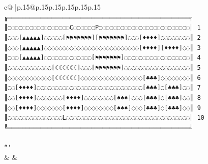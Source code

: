 \documentclass{article}
\begin{document}
{\begin{supertabular}{c@{$\;$}|p{.15\linewidth}@{}p{.15\linewidth}p{.15\linewidth}p{.15\linewidth}p{.15\linewidth}p{.15\linewidth}}
{{{\texttt{╔══════════════════════════════════════════════════╗} \\
\texttt{║◌◌◌◌◌◌◌◌◌◌◌◌◌◌◌◌◌C◌◌◌◌◌◌P◌◌◌◌◌◌◌◌◌◌◌◌◌◌◌◌◌◌◌◌◌◌◌◌◌║ 1} \\
\texttt{║◌◌◌{[}▲▲▲▲▲{]}◌◌◌◌◌{[}⚑⚑⚑⚑⚑⚑⚑{]}{[}⚑⚑⚑⚑⚑⚑⚑{]}◌◌◌{[}♦♦♦♦{]}◌◌◌◌◌◌◌◌║ 2} \\
\texttt{║◌◌◌{[}▲▲▲▲▲{]}◌◌◌◌◌◌◌◌◌◌◌◌◌◌◌◌◌◌◌◌◌◌◌◌◌◌{[}♦♦♦♦{]}{[}♦♦♦♦{]}◌◌║ 3} \\
\texttt{║◌◌◌{[}▲▲▲▲▲{]}◌◌◌◌◌◌◌◌◌◌◌◌◌{[}⚑⚑⚑⚑⚑⚑⚑{]}◌◌◌◌◌◌◌◌◌◌◌◌◌◌◌◌◌◌║ 4} \\
\texttt{║◌◌◌◌◌◌◌◌◌◌◌◌{[}☾☾☾☾☾☾{]}◌◌◌{[}⚑⚑⚑⚑⚑⚑⚑{]}◌◌◌◌◌◌◌◌◌◌◌◌◌◌◌◌◌◌║ 5} \\
\texttt{║◌◌◌◌◌◌◌◌◌◌◌◌{[}☾☾☾☾☾☾{]}◌◌◌◌◌◌◌◌◌◌◌◌◌◌◌◌◌{[}♣♣♣{]}◌◌◌◌◌◌◌◌║ 6} \\
\texttt{║◌◌{[}♦♦♦♦{]}◌◌◌◌◌◌◌◌◌◌◌◌◌◌◌◌◌◌◌◌◌◌◌◌◌◌◌◌◌{[}♣♣♣{]}◌{[}♣♣♣{]}◌◌║ 7} \\
\texttt{║◌◌{[}♦♦♦♦{]}◌◌◌◌◌◌◌{[}♦♦♦♦{]}◌◌◌◌◌◌◌◌{[}♠♠♠{]}◌◌◌{[}♣♣♣{]}◌{[}♣♣♣{]}◌◌║ 8} \\
\texttt{║◌◌{[}♦♦♦♦{]}◌◌◌◌◌◌◌{[}♦♦♦♦{]}◌◌◌◌◌◌◌◌{[}♠♠♠{]}◌◌◌{[}♣♣♣{]}◌{[}♣♣♣{]}◌◌║ 9} \\
\texttt{║◌◌◌◌◌◌◌◌◌◌◌◌◌◌◌L◌◌◌◌◌◌◌◌◌◌◌◌◌◌◌◌◌◌◌◌◌◌◌◌◌◌◌◌◌◌◌◌◌◌║ 10} \\
\texttt{╚══════════════════════════════════════════════════╝} \\
\\ 
\texttt{```} \\
            }
        }
    }
    & & \\ \\


\end{supertabular}}
\end{document}
